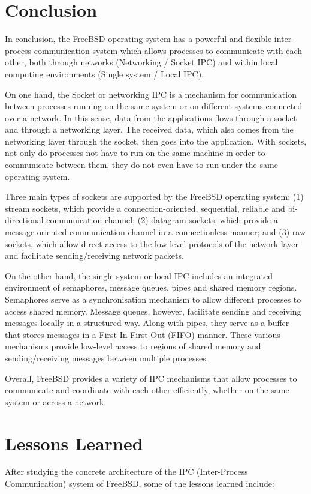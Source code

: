 \documentclass[12pt, dvipsnames, a4paper]{article}
\begin{document}
\section{Conclusion}
In conclusion, the FreeBSD operating system has a powerful and flexible inter-process communication system which allows processes to communicate with each other, both through networks (Networking / Socket IPC) and within local computing environments (Single system / Local IPC). 

On one hand, the Socket or networking IPC is a mechanism for communication between processes running on the same system or on different systems connected over a network. In this sense, data from the applications flows through a socket and through a networking layer. The received data, which also comes from the networking layer through the socket, then goes into the application. With sockets, not only do processes not have to run on the same machine in order to communicate between them, they do not even have to run under the same operating system.

Three main types of sockets are supported by the FreeBSD operating system: (1) stream sockets, which provide a connection-oriented, sequential, reliable and bi-directional communication channel; (2) datagram sockets, which provide a message-oriented communication channel in a connectionless manner; and (3) raw sockets, which allow direct access to the low level protocols of the network layer and facilitate sending/receiving network packets.

On the other hand, the single system or local IPC includes an integrated environment of semaphores, message queues, pipes and shared memory regions. Semaphores serve as a synchronisation mechanism to allow different processes to access shared memory. Message queues, however, facilitate sending and receiving messages locally in a structured way. Along with pipes, they serve as a buffer that stores messages in a First-In-First-Out (FIFO) manner. These various mechanisms provide low-level access to regions of shared memory and sending/receiving messages between multiple processes. 

Overall, FreeBSD provides a variety of IPC mechanisms that allow processes to communicate and coordinate with each other efficiently, whether on the same system or across a network.

\section{Lessons Learned}
After studying the concrete architecture of the IPC (Inter-Process Communication) system of FreeBSD, some of the lessons learned include:
\end{document}
